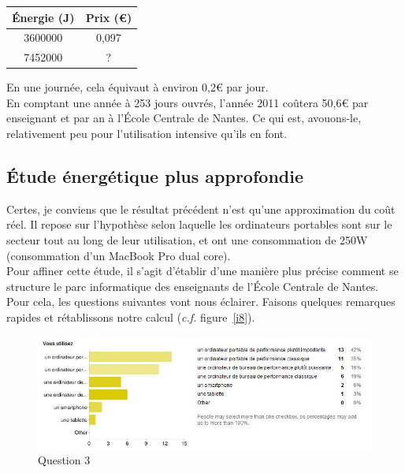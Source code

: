 \documentclass[a4paper,11pt,french]{article}
\begin{document}
\begin{center}
\begin{tabular}{|c|c|}
\hline  Énergie (J)	& Prix (\euro{})  \\ 
\hline  3600000 &  0,097\\ 
\hline  7452000 & ? \\ 
\hline 
\end{tabular} 
\end{center}

En une journée, cela équivaut à environ 0,2\euro{} par jour.\\

En comptant une année à 253 jours ouvrés, l'année 2011 coûtera 50,6\euro{} par enseignant et par an à l'École Centrale de Nantes. Ce qui est, avouons-le, relativement peu pour l'utilisation intensive qu'ils en font.\\



\subsection{Étude énergétique plus approfondie}

Certes, je conviens que le résultat précédent n'est qu'une approximation du coût réel. Il repose sur l'hypothèse selon laquelle les ordinateurs portables sont sur le secteur tout au long de leur utilisation, et ont une consommation de 250W (consommation d'un MacBook Pro dual core).\\

Pour affiner cette étude, il s'agit d'établir d'une manière plus précise comment se structure le parc informatique des enseignants de l'École Centrale de Nantes. Pour cela, les questions suivantes vont nous éclairer. Faisons quelques remarques rapides et rétablissons notre calcul (\textit{c.f.} figure~\vref{i8}).\\

\begin{figure}[h!]
\includegraphics[width=\textwidth]{i8.JPG}
\caption{Question 3}
\label{i8}
\end{figure}
\end{document}
